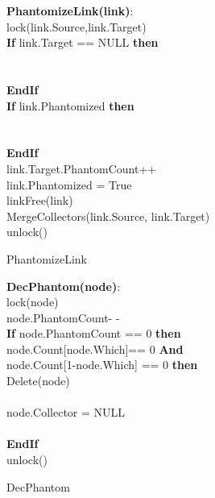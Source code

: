 \setlength{\textfloatsep}{0pt}
\begin{algorithm}[ht]
{\small
{\bf PhantomizeLink(link)}:\\
{\Indp
 {lock(link.Source,link.Target)}\\
 {\bf If} link.Target == NULL {\bf then}\\
\\
 \\
 {\bf EndIf}\\
{\bf If} link.Phantomized {\bf then}\\
\\
 \\
{\bf EndIf}\\
link.Target.PhantomCount++\\
link.Phantomized = True\\
linkFree(link)\\
MergeCollectors(link.Source, link.Target)\\
 {unlock()}\\
}
}
\caption{PhantomizeLink}
\label{single:algorithm:phantomizelink}
\end{algorithm}
\setlength{\textfloatsep}{0pt}
\begin{algorithm}[ht]
{\small
{\bf DecPhantom(node)}:\\
{\Indp
 {lock(node)}\\
node.PhantomCount- -\\
{\bf If} node.PhantomCount == 0 {\bf then}\\
 node.Count[node.Which]== 0 {\bf And}\\
\quad \quad \quad node.Count[1-node.Which] == 0 {\bf then}\\
\quad \quad Delete(node)\\
\\
\quad \quad node.Collector = NULL\\
\\
{\bf EndIf}\\
 {unlock()}\\
}
}
\caption{DecPhantom}
\label{single:algorithm:decPhantom}
\end{algorithm}
\setlength{\textfloatsep}{0pt}

